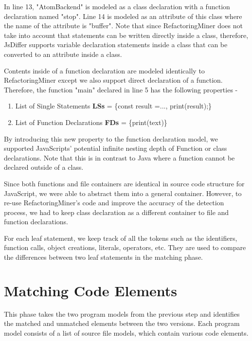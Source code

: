 \documentclass[letterpaper,12pt,onecolumn,final]{report}
\begin{document}
In line 13, "AtomBackend" is modeled as a class declaration with a function declaration named "stop". Line 14 is modeled as an attribute of this class where the name of the attribute is "buffer". Note that since RefactoringMiner does not take into account that statements can be written directly inside a class, therefore, JsDiffer supports variable declaration statements inside a class that can be converted to an attribute inside a class.

Contents inside of a function declaration are modeled identically to RefactoringMiner except we also support direct declaration of a function. Therefore, the function "main" declared in line 5 has the following properties -

\begin{enumerate}
\item List of Single Statements \textbf{LSs} = \{const result =..., print(result);\}
\item List of Function Declarations \textbf{FDs} = \{print(text)\}
\end{enumerate}


By introducing this new property to the function declaration model, we supported JavaScripts' potential infinite nesting depth of Function or class declarations. Note that this is in contrast to Java where a function cannot be declared outside of a class.

Since both functions and file containers are identical in source code structure for JavaScript, we were able to abstract them into a general container. However, to re-use RefactoringMiner's code and improve the accuracy of the detection process, we had to keep class declaration as a different container to file and function declarations.

For each leaf statement, we keep track of all the tokens such as the identifiers, function calls, object creations, literals, operators, etc. They are used to compare the differences between two leaf statements in the matching phase.

\section {Matching Code Elements}
This phase takes the two program models from the previous step and identifies the matched and unmatched elements between the two versions. Each program model consists of a list of source file models, which contain various code elements.
\end{document}
